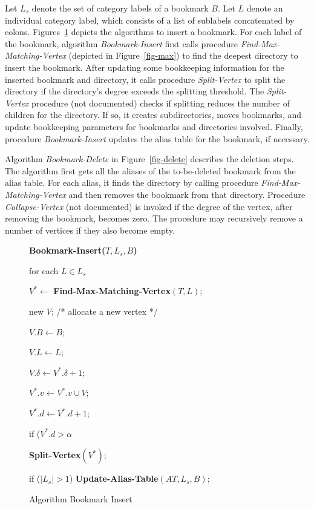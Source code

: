 Let $L_s$ denote the set of category labels of a bookmark $B$.
Let $L$ denote an individual category label, which consists of
a list of sublabels concatenated by colons. 
Figures~\ref{fig-insert} depicts the
algorithms to insert a bookmark.
For each label of the bookmark, 
algorithm {\it Bookmark-Insert} first calls procedure 
{\it Find-Max-Matching-Vertex} (depicted in Figure~\ref{fig-max})
to find the deepest directory
to insert the bookmark. After updating some bookkeeping
information for the inserted bookmark and directory, 
it calls procedure {\it Split-Vertex}
to split the directory if the directory's degree exceeds the
splitting threshold.  The {\it Split-Vertex} procedure (not
documented) checks if splitting reduces the number of children for
the directory. If so, it creates subdirectories, moves
bookmarks, and update bookkeeping parameters for
bookmarks and directories involved.
Finally, procedure {\it Bookmark-Insert}
updates the alias table for the bookmark,
if necessary. 

Algorithm {\it Bookmark-Delete} in Figure~\ref{fig-delete}
describes the deletion steps. The algorithm first
gets all the aliases of the to-be-deleted bookmark from the alias
table. For each alias, it finds the directory by calling
procedure {\it Find-Max-Matching-Vertex} and then removes
the bookmark from that directory. Procedure 
{\it Collapse-Vertex} (not documented) is invoked
if the degree of the vertex, after removing the bookmark,
becomes zero. The procedure may recursively remove a
number of vertices if they also become empty.

\begin{figure}
{\bf Bookmark-Insert($T,L_s,B$)}
\begin{nlist}
\item for each $L \in L_s$
 \begin{nlist}
 \item $V^* \leftarrow$ {\bf Find-Max-Matching-Vertex}$(T,L)$;
 \item new $V$; /* allocate a new vertex */
 \item $V.B \leftarrow B$; 
 \item $V.L \leftarrow L$;
 \item $V.\delta \leftarrow V^*.\delta + 1$;
 \item $V^*.v \leftarrow V^*.v \cup V$;
 \item $V^*.d \leftarrow V^*.d + 1$;
 \item if ($V^*.d > \alpha$

       {\bf Split-Vertex}$(V^*)$;
 \end{nlist}
 \item if ($|L_s| > 1$) {\bf Update-Alias-Table}$(AT, L_s, B)$;
\end{nlist}
\caption{Algorithm Bookmark Insert}
\label{fig-insert}
\end{figure}

